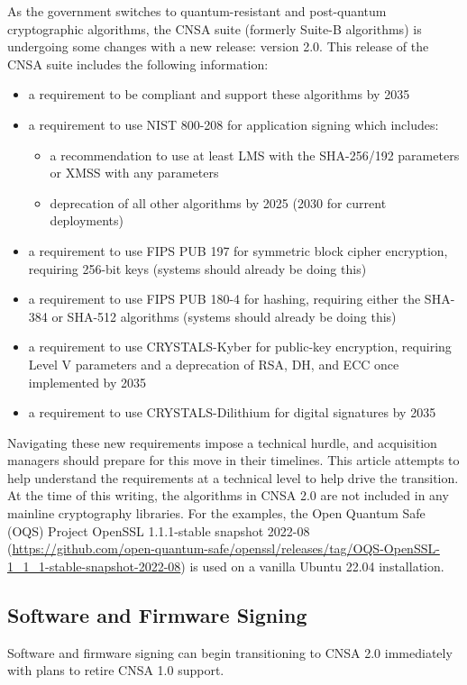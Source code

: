 As the government switches to quantum-resistant and post-quantum cryptographic algorithms, the CNSA suite (formerly Suite-B algorithms) is undergoing some changes with a new release: version 2.0. This release of the CNSA suite includes the following information:\autocite{20220919:cnsa}
\begin{itemize}
	\item a requirement to be compliant and support these algorithms by 2035
	\item a requirement to use NIST 800-208 for application signing which includes:
	\begin{itemize}
		\item a recommendation to use at least LMS with the SHA-256/192 parameters or XMSS with any parameters
		\item deprecation of all other algorithms by 2025 (2030 for current deployments)
	\end{itemize}
	\item a requirement to use FIPS PUB 197 for symmetric block cipher encryption, requiring 256-bit keys (systems should already be doing this)
	\item a requirement to use FIPS PUB 180-4 for hashing, requiring either the SHA-384 or SHA-512 algorithms (systems should already be doing this)
	\item a requirement to use CRYSTALS-Kyber for public-key encryption, requiring Level V parameters and a deprecation of RSA, DH, and ECC once implemented by 2035
	\item a requirement to use CRYSTALS-Dilithium for digital signatures by 2035
\end{itemize}

Navigating these new requirements impose a technical hurdle, and acquisition managers should prepare for this move in their timelines. This article attempts to help understand the requirements at a technical level to help drive the transition. At the time of this writing, the algorithms in CNSA 2.0 are not included in any mainline cryptography libraries. For the examples, the Open Quantum Safe (OQS) Project OpenSSL 1.1.1-stable snapshot 2022-08 (\url{https://github.com/open-quantum-safe/openssl/releases/tag/OQS-OpenSSL-1_1_1-stable-snapshot-2022-08}) is used on a vanilla Ubuntu 22.04 installation.

\subsection{Software and Firmware Signing}
Software and firmware signing can begin transitioning to CNSA 2.0 immediately with plans to retire CNSA 1.0 support.

